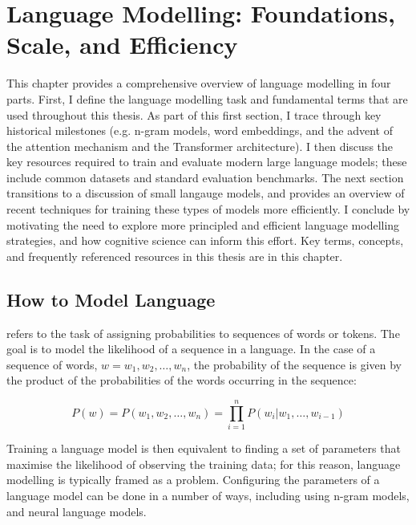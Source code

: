 \chapter{Language Modelling: Foundations, Scale, and Eﬀiciency}


This chapter provides a comprehensive overview of language modelling in four parts. First, I define the language modelling task and fundamental terms that are used throughout this thesis. As part of this first section, I trace through key historical milestones (e.g. n-gram models, word embeddings, and the advent of the attention mechanism and the Transformer architecture). I then discuss the key resources required to train and evaluate modern large language models; these include common datasets and standard evaluation benchmarks. The next section transitions to a discussion of small langauge models, and provides an overview of recent techniques for training these types of models more efficiently. I conclude by motivating the need to explore more principled and efficient language modelling strategies, and how cognitive science can inform this effort. Key terms, concepts, and frequently referenced resources in this thesis are  in this chapter.

\section{How to Model Language}
\label{sec:lm-foundations}

 refers to the task of assigning probabilities to sequences of words or tokens. The goal is to model the likelihood of a sequence in a language. In the case of a sequence of words, $w = w_1, w_2, \ldots, w_n$, the probability of the sequence is given by the product of the probabilities of the words occurring in the sequence:

\begin{equation}    
    P(w) = P(w_1, w_2, \ldots, w_n) = \prod_{i=1}^n P(w_i | w_1, \ldots, w_{i-1})
\label{eq:lm-joint-distribution}
\end{equation}

Training a language model is then equivalent to finding a set of parameters that maximise the likelihood of observing the training data; for this reason, language modelling is typically framed as a  problem. Configuring the parameters of a language model can be done in a number of ways, including using n-gram models, and neural language models.

